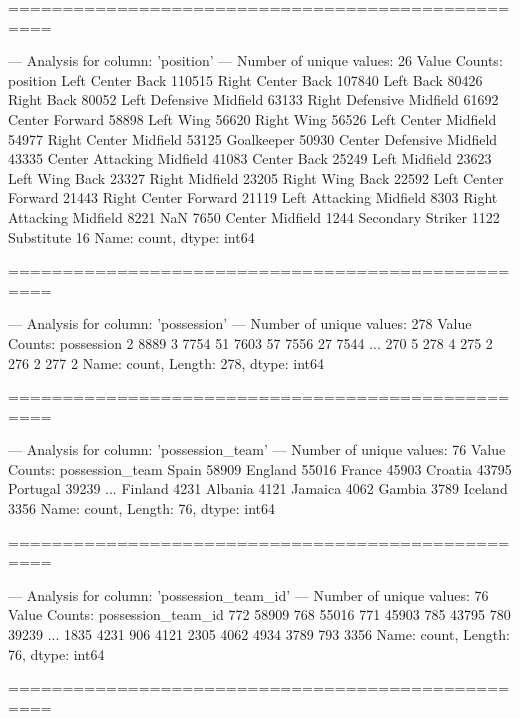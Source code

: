 ==================================================

--- Analysis for column: 'position' ---
Number of unique values: 26
Value Counts:
position
Left Center Back             110515
Right Center Back            107840
Left Back                     80426
Right Back                    80052
Left Defensive Midfield       63133
Right Defensive Midfield      61692
Center Forward                58898
Left Wing                     56620
Right Wing                    56526
Left Center Midfield          54977
Right Center Midfield         53125
Goalkeeper                    50930
Center Defensive Midfield     43335
Center Attacking Midfield     41083
Center Back                   25249
Left Midfield                 23623
Left Wing Back                23327
Right Midfield                23205
Right Wing Back               22592
Left Center Forward           21443
Right Center Forward          21119
Left Attacking Midfield        8303
Right Attacking Midfield       8221
NaN                            7650
Center Midfield                1244
Secondary Striker              1122
Substitute                       16
Name: count, dtype: int64

==================================================

--- Analysis for column: 'possession' ---
Number of unique values: 278
Value Counts:
possession
2      8889
3      7754
51     7603
57     7556
27     7544
       ... 
270       5
278       4
275       2
276       2
277       2
Name: count, Length: 278, dtype: int64

==================================================

--- Analysis for column: 'possession_team' ---
Number of unique values: 76
Value Counts:
possession_team
Spain       58909
England     55016
France      45903
Croatia     43795
Portugal    39239
            ...  
Finland      4231
Albania      4121
Jamaica      4062
Gambia       3789
Iceland      3356
Name: count, Length: 76, dtype: int64

==================================================

--- Analysis for column: 'possession_team_id' ---
Number of unique values: 76
Value Counts:
possession_team_id
772     58909
768     55016
771     45903
785     43795
780     39239
        ...  
1835     4231
906      4121
2305     4062
4934     3789
793      3356
Name: count, Length: 76, dtype: int64

==================================================


